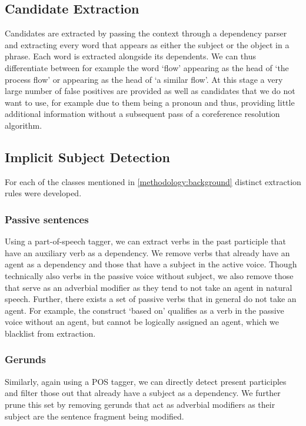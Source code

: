 \documentclass[times, 10pt,twocolumn]{article}
\begin{document}
\subsection{Candidate Extraction}
Candidates are extracted by passing the context through a dependency parser and extracting every word that
appears as either the subject or the object in a phrase. Each word is extracted alongside its dependents.
We can thus differentiate between for example the word `flow' appearing as the head of `the process flow'
or appearing as the head of `a similar flow'. At this stage a very large number of false positives
are provided as well as candidates that we do not want to use, for example due to them being a pronoun
and thus, providing little additional information without a subsequent pass of a coreference resolution
algorithm.


\subsection{Implicit Subject Detection}
For each of the classes mentioned in \ref{methodology:background} distinct extraction rules were developed.

\subsubsection{Passive sentences}
Using a part-of-speech tagger, we can extract verbs in the past participle that have an
auxiliary verb as a dependency. We remove verbs that
already have an agent as a dependency and those that have a subject in the active voice.
Though technically also verbs in the passive voice without subject, we also remove those that
serve as an adverbial modifier as they tend to not take an agent in natural speech.
Further, there exists a set of passive verbs that in general do not take an agent.
For example, the construct `based on' qualifies as a verb in the passive voice without an agent,
but cannot be logically assigned an agent, which we blacklist from extraction.  

\subsubsection{Gerunds}
Similarly, again using a POS tagger, we can directly detect present participles and filter those
out that already have a subject as a dependency. We further prune this set by removing gerunds that
act as adverbial modifiers as their subject are the sentence fragment being modified. 
\end{document}
